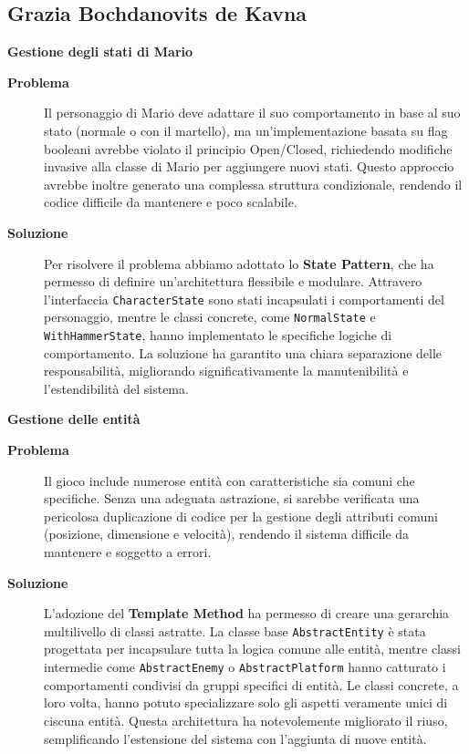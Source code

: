 \documentclass[a4paper,12pt]{report}
\begin{document}
\subsection{Grazia Bochdanovits de Kavna}
\textbf{Gestione degli stati di Mario}
\begin{description}
	\item[\textbf{Problema}]
	      Il personaggio di Mario deve adattare il suo comportamento in base al suo stato (normale o con il martello), ma un'implementazione basata su flag booleani avrebbe violato il principio Open/Closed,
	      richiedendo modifiche invasive alla classe di Mario per aggiungere nuovi stati. Questo approccio avrebbe inoltre generato una complessa struttura condizionale, rendendo il codice difficile da mantenere e poco scalabile.

	\item[\textbf{Soluzione}]
	      Per risolvere il problema abbiamo adottato lo \textbf{State Pattern}, che ha permesso di definire un'architettura flessibile e modulare. Attravero l'interfaccia \texttt{CharacterState} sono stati
	      incapsulati i comportamenti del personaggio, mentre le classi concrete, come \texttt{NormalState} e \texttt{WithHammerState}, hanno implementato le specifiche logiche di comportamento.
	      La soluzione ha garantito una chiara separazione delle responsabilità, migliorando significativamente la manutenibilità e l'estendibilità del sistema.
\end{description}

\noindent
\textbf{Gestione delle entità}
\begin{description}
	\item[\textbf{Problema}]
	      Il gioco include numerose entità con caratteristiche sia comuni che specifiche. Senza una adeguata astrazione, si sarebbe verificata una pericolosa duplicazione di codice per la gestione degli attributi
	      comuni (posizione, dimensione e velocità), rendendo il sistema difficile da mantenere e soggetto a errori.

	\item[\textbf{Soluzione}]
	      L'adozione del \textbf{Template Method} ha permesso di creare una gerarchia multilivello di classi astratte. La classe base \texttt{AbstractEntity} è stata progettata per incapsulare tutta la logica comune
	      alle entità, mentre classi intermedie come \texttt{AbstractEnemy} o \texttt{AbstractPlatform} hanno catturato i comportamenti condivisi da gruppi specifici di entità.
	      Le classi concrete, a loro volta, hanno potuto specializzare solo gli aspetti veramente unici di ciscuna entità. Questa architettura ha notevolemente migliorato il riuso, semplificando l'estensione del sistema
	      con l'aggiunta di nuove entità.

\end{description}
\end{document}
